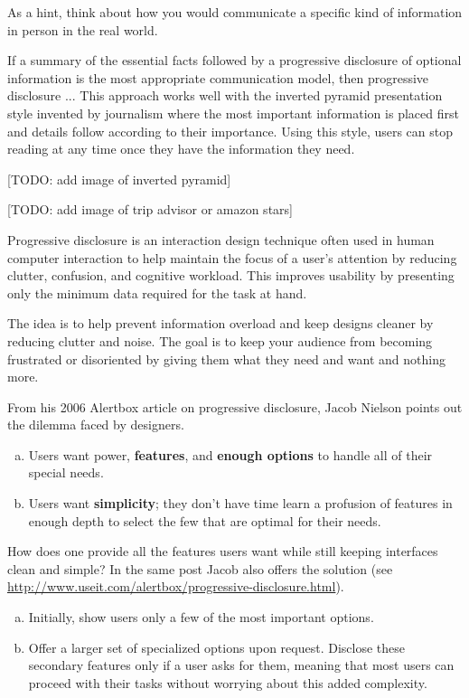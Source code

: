 As a hint, think about how you would communicate a specific kind of information in person in the real world.

If a summary of the essential facts followed by a progressive disclosure of optional information is the most appropriate communication model, then progressive disclosure ...
This approach works well with the inverted pyramid presentation style invented by journalism where the most important information is placed first and details follow according to their importance. Using this style, users can stop reading at any time once they have the information they need.

[TODO: add image of inverted pyramid]


[TODO: add image of trip advisor or amazon stars]


Progressive disclosure is an interaction design technique often used in human computer interaction to help maintain the focus of a user's attention by reducing clutter, confusion, and cognitive workload. This improves usability by presenting only the minimum data required for the task at hand.

The idea is to help prevent information overload and keep designs cleaner by reducing clutter and noise. The goal is to keep your audience from becoming frustrated or disoriented by giving them what they need and want and nothing more.

From his 2006 Alertbox article on progressive disclosure, Jacob Nielson points out the dilemma faced by designers.

\begin{enumerate}[(a)]
	\item Users want power, \textbf{features}, and \textbf{enough options} to handle all of their special needs.
	\item Users want \textbf{simplicity}; they don’t have time learn a profusion of features in enough depth to select the few that are optimal for their needs.
\end{enumerate}

How does one provide all the features users want while still keeping interfaces clean and simple? In the same post Jacob also offers the solution (see \url{http://www.useit.com/alertbox/progressive-disclosure.html}).

\begin{enumerate}[(a)]
	\item Initially, show users only a few of the most important options.
	\item Offer a larger set of specialized options upon request. Disclose these secondary features only if a user asks for them, meaning that most users can proceed with their tasks without worrying about this added complexity.
\end{enumerate}

